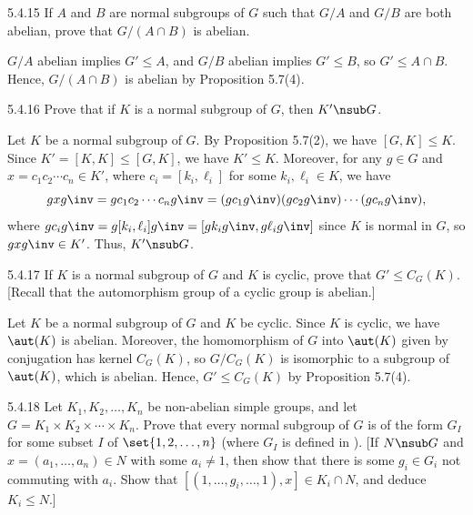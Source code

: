 \begin{exercise}{5.4.15}
    If $A$ and $B$ are normal subgroups of $G$ such that $G/A$ and $G/B$ are both abelian, prove that $G/(A \cap B)$ is abelian.
\end{exercise}

\begin{sol}
    $G/A$ abelian implies $G' \leq A$, and $G/B$ abelian implies $G' \leq B$, so $G' \leq A \cap B$.
	Hence, $G/(A \cap B)$ is abelian by Proposition 5.7(4).
\end{sol}

\begin{exercise}{5.4.16}
    Prove that if $K$ is a normal subgroup of $G$, then $K' \nsub G$.
\end{exercise}

\begin{sol}
    Let $K$ be a normal subgroup of $G$.
	By Proposition 5.7(2), we have $[G, K] \leq K$.
	Since $K' = [K, K] \leq [G, K]$, we have $K' \leq K$.
	Moreover, for any $g \in G$ and $x = c_1 c_2 \cdots c_n \in K'$, where $c_i = [k_i, \ell_i]$ for some $k_i, \ell_i \in K$, we have
    \[
    	g x g\inv = g c_1 c_2 \cdots c_n g\inv = (g c_1 g\inv)(g c_2 g\inv) \cdots (g c_n g\inv),
    \]
    where $g c_i g\inv = g [k_i, \ell_i] g\inv = [g k_i g\inv, g \ell_i g\inv]$ since $K$ is normal in $G$, so $g x g\inv \in K'$.
	Thus, $K' \nsub G$.
\end{sol}

\begin{exercise}{5.4.17}
    If $K$ is a normal subgroup of $G$ and $K$ is cyclic, prove that $G' \leq C_G(K)$. [Recall that the automorphism group of a cyclic group is abelian.]
\end{exercise}

\begin{sol}
    Let $K$ be a normal subgroup of $G$ and $K$ be cyclic.
	Since $K$ is cyclic, we have $\aut(K)$ is abelian.
	Moreover, the homomorphism of $G$ into $\aut(K)$ given by conjugation has kernel $C_G(K)$, so $G/C_G(K)$ is isomorphic to a subgroup of $\aut(K)$, which is abelian.
	Hence, $G' \leq C_G(K)$ by Proposition 5.7(4).
\end{sol}

\begin{exercise}{5.4.18}
    Let $K_1, K_2, \ldots, K_n$ be non-abelian simple groups, and let $G = K_1 \times K_2 \times \cdots \times K_n$.
	Prove that every normal subgroup of $G$ is of the form $G_I$ for some subset $I$ of $\set{1, 2, \ldots, n}$ (where $G_I$ is defined in ). [If $N \nsub G$ and $x = (a_1, \ldots, a_n) \in N$ with some $a_i \neq 1$, then show that there is some $g_i \in G_i$ not commuting with $a_i$.
	Show that $[(1, \ldots, g_i, \ldots, 1), x] \in K_i \cap N$, and deduce $K_i \leq N$.]
\end{exercise}

